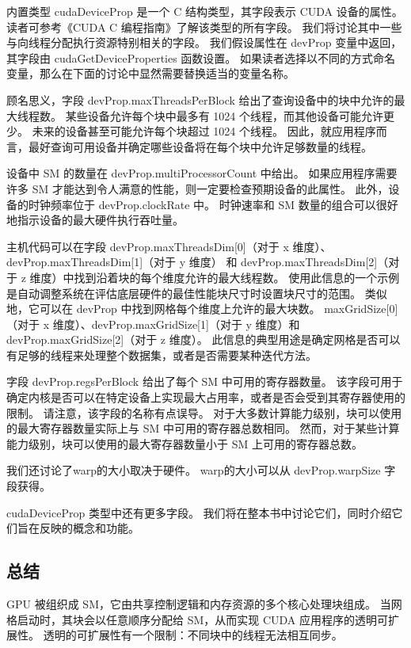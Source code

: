 内置类型 cudaDeviceProp 是一个 C 结构类型，其字段表示 CUDA 设备的属性。 
读者可参考《CUDA C 编程指南》了解该类型的所有字段。 我们将讨论其中一些与向线程分配执行资源特别相关的字段。 
我们假设属性在 devProp 变量中返回，其字段由 cudaGetDeviceProperties 函数设置。 
如果读者选择以不同的方式命名变量，那么在下面的讨论中显然需要替换适当的变量名称。

顾名思义，字段 devProp.maxThreadsPerBlock 给出了查询设备中的块中允许的最大线程数。 
某些设备允许每个块中最多有 1024 个线程，而其他设备可能允许更少。 未来的设备甚至可能允许每个块超过 1024 个线程。 
因此，就应用程序而言，最好查询可用设备并确定哪些设备将在每个块中允许足够数量的线程。

设备中 SM 的数量在 devProp.multiProcessorCount 中给出。 
如果应用程序需要许多 SM 才能达到令人满意的性能，则一定要检查预期设备的此属性。 
此外，设备的时钟频率位于 devProp.clockRate 中。 时钟速率和 SM 数量的组合可以很好地指示设备的最大硬件执行吞吐量。

主机代码可以在字段 devProp.maxThreadsDim[0]（对于 x 维度）、
devProp.maxThreadsDim[1]（对于 y 维度）
和 devProp.maxThreadsDim[2]（对于 z 维度）中找到沿着块的每个维度允许的最大线程数。 
使用此信息的一个示例是自动调整系统在评估底层硬件的最佳性能块尺寸时设置块尺寸的范围。 
类似地，它可以在 devProp 中找到网格每个维度上允许的最大块数。 
maxGridSize[0]（对于 x 维度）、devProp.maxGridSize[1]（对于 y 维度）和 devProp.maxGridSize[2]（对于 z 维度）。 
此信息的典型用途是确定网格是否可以有足够的线程来处理整个数据集，或者是否需要某种迭代方法。

字段 devProp.regsPerBlock 给出了每个 SM 中可用的寄存器数量。 
该字段可用于确定内核是否可以在特定设备上实现最大占用率，或者是否会受到其寄存器使用的限制。 
请注意，该字段的名称有点误导。 对于大多数计算能力级别，块可以使用的最大寄存器数量实际上与 SM 中可用的寄存器总数相同。 
然而，对于某些计算能力级别，块可以使用的最大寄存器数量小于 SM 上可用的寄存器总数。

我们还讨论了warp的大小取决于硬件。 warp的大小可以从 devProp.warpSize 字段获得。

cudaDeviceProp 类型中还有更多字段。 我们将在整本书中讨论它们，同时介绍它们旨在反映的概念和功能。

\subsection{总结}
GPU 被组织成 SM，它由共享控制逻辑和内存资源的多个核心处理块组成。 
当网格启动时，其块会以任意顺序分配给 SM，从而实现 CUDA 应用程序的透明可扩展性。 
透明的可扩展性有一个限制：不同块中的线程无法相互同步。

